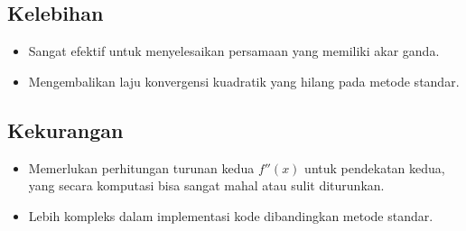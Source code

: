 \documentclass[12pt,a4paper]{article}
\begin{document}
\subsection{Kelebihan}
\begin{itemize}
  \item Sangat efektif untuk menyelesaikan persamaan yang memiliki akar ganda.
  \item Mengembalikan laju konvergensi kuadratik yang hilang pada metode standar.
\end{itemize}

\subsection{Kekurangan}
\begin{itemize}
  \item Memerlukan perhitungan turunan kedua $f''(x)$ untuk pendekatan kedua, yang secara komputasi bisa sangat mahal atau sulit diturunkan.
  \item Lebih kompleks dalam implementasi kode dibandingkan metode standar.
\end{itemize}
\end{document}
